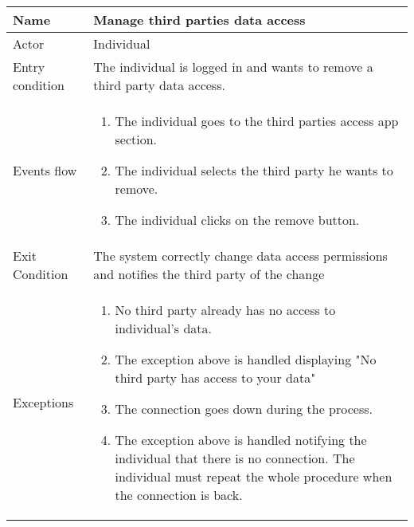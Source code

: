 \begin{tabular}{|l|p{13cm}|}
    \hline
    Name & Manage third parties data access
    \\ \hline
    Actor & Individual
    \\ \hline 
    Entry condition & The individual is logged in and wants to remove a third party data access.
        \\ \hline
    Events flow &
    \begin{enumerate}
	\item The individual goes to the third parties access app section.
    \item The individual selects the third party he wants to remove.
    \item The individual clicks on the remove button.
    \end{enumerate}
     \\ \hline
     Exit Condition & The system correctly change data access permissions and notifies the third party of the change
     \\
    \hline
    Exceptions &
        \begin{enumerate}
    \item No third party already has no access to individual's data.
    \item The exception above is handled displaying "No third party has access to your data"
    \item The connection goes down during the process. 
    \item The exception above is handled notifying the individual that there is no connection. The individual must repeat the whole procedure when the connection is back.
    \end{enumerate}
       \\
    \hline
\end{tabular}



